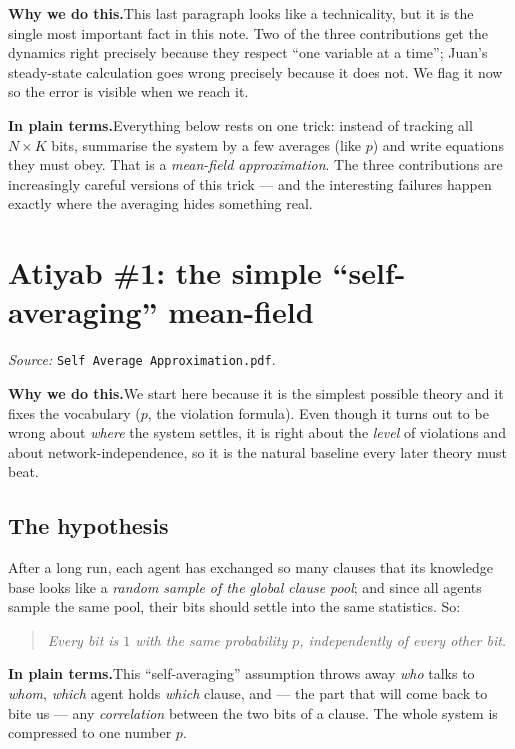 \documentclass[11pt]{article}
\newcommand{\plain}[1]{%
  \par\smallskip\noindent
  \colorbox{yellow!18}{\parbox{\dimexpr\linewidth-2\fboxsep}{%
  \textbf{In plain terms.}\quad #1}}\par\smallskip}
\newcommand{\why}[1]{%
  \par\smallskip\noindent
  \colorbox{blue!8}{\parbox{\dimexpr\linewidth-2\fboxsep}{%
  \textbf{Why we do this.}\quad #1}}\par\smallskip}
\begin{document}
\why{This last paragraph looks like a technicality, but it is the single most important fact in this
note. Two of the three contributions get the dynamics right precisely because they respect
``one variable at a time''; Juan's steady-state calculation goes wrong precisely because it does
not. We flag it now so the error is visible when we reach it.}

\plain{Everything below rests on one trick: instead of tracking all $N\times K$ bits, summarise the
system by a few averages (like $p$) and write equations they must obey. That is a \emph{mean-field
approximation}. The three contributions are increasingly careful versions of this trick --- and
the interesting failures happen exactly where the averaging hides something real.}

\section{Atiyab \#1: the simple ``self-averaging'' mean-field}
\emph{Source: }\texttt{Self Average Approximation.pdf}.

\why{We start here because it is the simplest possible theory and it fixes the vocabulary
($p$, the violation formula). Even though it turns out to be wrong about \emph{where} the system
settles, it is right about the \emph{level} of violations and about network-independence, so it is
the natural baseline every later theory must beat.}

\subsection{The hypothesis}
After a long run, each agent has exchanged so many clauses that its knowledge base looks like a
\emph{random sample of the global clause pool}; and since all agents sample the same pool, their
bits should settle into the same statistics. So:
\begin{quote}\emph{Every bit is $1$ with the same probability $p$, independently of every other bit.}\end{quote}

\plain{This ``self-averaging'' assumption throws away \emph{who} talks to \emph{whom}, \emph{which}
agent holds \emph{which} clause, and --- the part that will come back to bite us --- any
\emph{correlation} between the two bits of a clause. The whole system is compressed to one number
$p$.}
\end{document}
